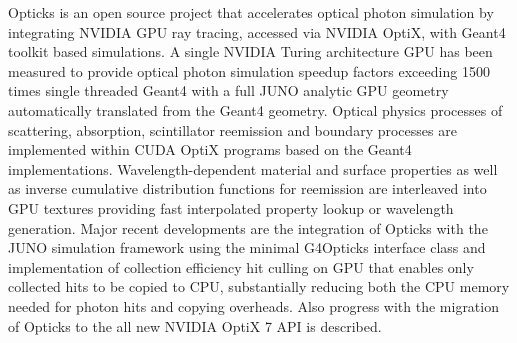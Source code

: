 Opticks is an open source project that accelerates optical photon simulation by 
integrating NVIDIA GPU ray tracing, accessed via NVIDIA OptiX, with 
Geant4 toolkit based simulations. 
A single NVIDIA Turing architecture GPU has been measured to provide optical 
photon simulation speedup factors exceeding 1500 times single threaded Geant4 
with a full JUNO analytic GPU geometry automatically translated from the Geant4 geometry.
%
Optical physics processes of scattering, absorption, scintillator reemission and 
boundary processes are implemented within CUDA OptiX programs based on the Geant4
implementations. Wavelength-dependent material and surface properties as well as  
inverse cumulative distribution functions for reemission are interleaved into 
GPU textures providing fast interpolated property lookup or wavelength generation.
%
Major recent developments are the integration of Opticks with the JUNO simulation 
framework using the minimal G4Opticks interface class and implementation 
of collection efficiency hit culling on GPU that enables only collected hits to be copied to CPU, 
substantially reducing both the CPU memory needed for photon hits and copying overheads. 
Also progress with the migration of Opticks to the 
all new NVIDIA OptiX 7 API is described.

